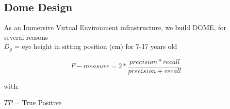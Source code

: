 \subsection{Dome Design}
As an Immersive Virtual Environment infrastructure, we
build DOME, for several reasons\\

\noindent $D_g$ = eye height in sitting position (cm) for 7-17 years old

\begin{equation}
    F-measure = 2 * \frac{precision * recall}{precision + recall}
    \label{eq4}
\end{equation}

\noindent with:

\noindent $TP$ = True Positive

